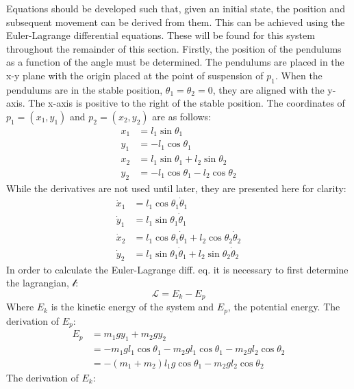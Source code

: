 
Equations should be developed such that, given an initial state, the position and subsequent movement can be derived from them.
This can be achieved using the Euler-Lagrange differential equations.
These will be found for this system throughout the remainder of this section.
Firstly, the position of the pendulums as a function of the angle must be determined.
The pendulums are placed in the x-y plane with the origin placed at the point of suspension of $p_1$.
When the pendulums are in the stable position, $\theta_1=\theta_2=0$, they are aligned with the y-axis.
The x-axis is positive to the right of the stable position.
The coordinates of $p_1=(x_1,y_1)$ and $p_2=(x_2,y_2)$ are as follows:
\begin{align}
	x_1 &= l_1\sin{\theta_1}\\
	y_1 &= -l_1\cos{\theta_1}\\
	x_2 &= l_1\sin{\theta_1} + l_2\sin{\theta_2}\\
	y_2 &= -l_1\cos{\theta_1} - l_2\cos{\theta_2}
\end{align}
While the derivatives are not used until later, they are presented here for clarity:
\begin{align}
	\dot{x}_1 &= l_1\cos{\theta}_1\dot{\theta}_1\\
	\dot{y}_1 &= l_1\sin{\theta}_1\dot{\theta}_1\\
	\dot{x}_2 &= l_1\cos{\theta}_1\dot{\theta}_1 + l_2\cos{\theta_2}\dot{\theta}_2\\
	\dot{y}_2 &= l_1\sin{\theta}_1\dot{\theta}_1 + l_2\sin{\theta_2}\dot{\theta}_2
\end{align}
In order to calculate the Euler-Lagrange diff. eq. it is necessary to first determine the lagrangian, $\mathcal{l}$:
\begin{equation}
	\mathcal{L}=E_k-E_p
\end{equation}
Where $E_k$ is the kinetic energy of the system and $E_p$, the potential energy.
The derivation of $E_p$:
\begin{align}
	E_p &= m_1 g y_1 + m_2 g y_2\\
		&= -m_1 g l_1 \cos{\theta_1} - m_2 g l_1 \cos{\theta_1} - m_2 g l_2 \cos{\theta_2}\\
		&= -(m_1+m_2)l_1g \cos{\theta_1}-m_2 g l_2 \cos{\theta_2}
		\label{eq:ep}
\end{align}
The derivation of $E_k$:
